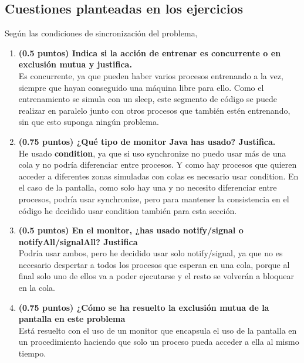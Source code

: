 \documentclass[a4paper,12pt,titlepage,oneside]{article}
\begin{document}
    \subsection{Cuestiones planteadas en los ejercicios}
        Según las condiciones de sincronización del problema, 
        \begin{enumerate}[label=\alph*)]
            \item \textbf{(0.5 puntos) Indica si la acción de entrenar es concurrente o en exclusión mutua y
            justifica.}\\
            Es concurrente, ya que pueden haber varios procesos entrenando a la vez, siempre que hayan conseguido
            una máquina libre para ello. Como el entrenamiento se simula con un sleep, este segmento de código
            se puede realizar en paralelo junto con otros procesos que también estén entrenando, 
            sin que esto suponga ningún problema.
            \item \textbf{(0.75 puntos) ¿Qué tipo de monitor Java has usado? Justifica.}\\
            He usado \textbf{condition}, ya que si uso synchronize no puedo usar más de una cola y no podría diferenciar
            entre procesos. Y como hay procesos que quieren acceder a diferentes zonas simuladas con colas es necesario
            usar condition. En el caso de la pantalla, como solo hay una y no necesito diferenciar entre procesos, 
            podría usar synchronize, pero para mantener la consistencia en el código he decidido usar condition 
            también para esta sección.
            \item \textbf{(0.5 puntos) En el monitor, ¿has usado notify/signal o notifyAll/signalAll? Justifica}\\
            Podría usar ambos, pero he decidido usar solo notify/signal, ya que no es necesario despertar a todos los
            procesos que esperan en una cola, porque al final solo uno de ellos va a poder ejecutarse y el resto se 
            volverán a bloquear en la cola.
            \item \textbf{(0.75 puntos) ¿Cómo se ha resuelto la exclusión mutua de la pantalla en este problema}\\
            Está resuelto con el uso de un monitor que encapsula el uso de la pantalla en un procedimiento
            haciendo que solo un proceso pueda acceder a ella al mismo tiempo.
            
        \end{enumerate}
    \newpage
\end{document}
